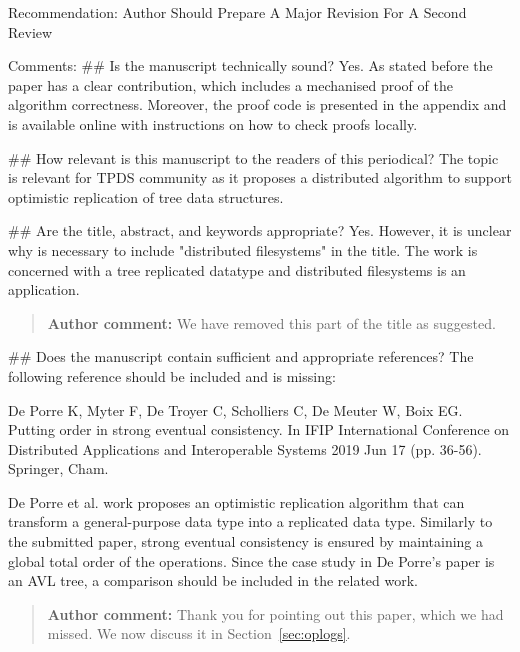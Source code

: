 \documentclass[10pt]{article}
\newcommand{\authorcomment}[1]{\begin{quote}\textbf{Author comment:} #1\end{quote}}
\begin{document}
\begin{spverbatim}
Recommendation: Author Should Prepare A Major Revision For A Second Review

Comments:
## Is the manuscript technically sound?
Yes. As stated before the paper has a clear contribution, which includes a mechanised proof of the algorithm correctness. Moreover, the proof code is presented in the appendix and is available online with instructions on how to check proofs locally.

## How relevant is this manuscript to the readers of this periodical?
The topic is relevant for TPDS community as it proposes a distributed algorithm to support optimistic replication of tree data structures.

## Are the title, abstract, and keywords appropriate?
Yes. However, it is unclear why is necessary to include "distributed filesystems" in the title. The work is concerned with a tree replicated datatype and distributed filesystems is an application.
\end{spverbatim}
\authorcomment{We have removed this part of the title as suggested.}
\begin{spverbatim}
## Does the manuscript contain sufficient and appropriate references?
The following reference should be included and is missing:

De Porre K, Myter F, De Troyer C, Scholliers C, De Meuter W, Boix EG. Putting order in strong eventual consistency. In IFIP International Conference on Distributed Applications and Interoperable Systems 2019 Jun 17 (pp. 36-56). Springer, Cham.

De Porre et al. work proposes an optimistic replication algorithm that can transform a general-purpose data type into a replicated data type. Similarly to the submitted paper, strong eventual consistency is ensured by maintaining a global total order of the operations. Since the case study in De Porre's paper is an AVL tree, a comparison should be included in the related work.
\end{spverbatim}
\authorcomment{Thank you for pointing out this paper, which we had missed. We now discuss it in Section~\ref{sec:oplogs}.}
\end{document}
